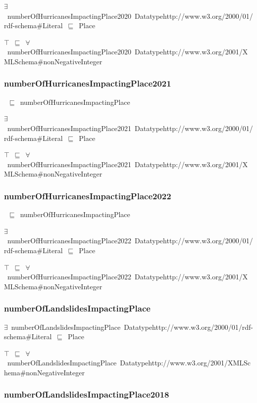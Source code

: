 \documentclass{article}
\begin{document}
\ensuremath{\exists}~numberOfHurricanesImpactingPlace2020~Datatypehttp://www.w3.org/2000/01/rdf-schema#Literal~\ensuremath{\sqsubseteq}~Place

\ensuremath{\top}~\ensuremath{\sqsubseteq}~\ensuremath{\forall}~numberOfHurricanesImpactingPlace2020~Datatypehttp://www.w3.org/2001/XMLSchema#nonNegativeInteger

\subsubsection*{numberOfHurricanesImpactingPlace2021}

~\ensuremath{\sqsubseteq}~numberOfHurricanesImpactingPlace

\ensuremath{\exists}~numberOfHurricanesImpactingPlace2021~Datatypehttp://www.w3.org/2000/01/rdf-schema#Literal~\ensuremath{\sqsubseteq}~Place

\ensuremath{\top}~\ensuremath{\sqsubseteq}~\ensuremath{\forall}~numberOfHurricanesImpactingPlace2021~Datatypehttp://www.w3.org/2001/XMLSchema#nonNegativeInteger

\subsubsection*{numberOfHurricanesImpactingPlace2022}

~\ensuremath{\sqsubseteq}~numberOfHurricanesImpactingPlace

\ensuremath{\exists}~numberOfHurricanesImpactingPlace2022~Datatypehttp://www.w3.org/2000/01/rdf-schema#Literal~\ensuremath{\sqsubseteq}~Place

\ensuremath{\top}~\ensuremath{\sqsubseteq}~\ensuremath{\forall}~numberOfHurricanesImpactingPlace2022~Datatypehttp://www.w3.org/2001/XMLSchema#nonNegativeInteger

\subsubsection*{numberOfLandslidesImpactingPlace}

\ensuremath{\exists}~numberOfLandslidesImpactingPlace~Datatypehttp://www.w3.org/2000/01/rdf-schema#Literal~\ensuremath{\sqsubseteq}~Place

\ensuremath{\top}~\ensuremath{\sqsubseteq}~\ensuremath{\forall}~numberOfLandslidesImpactingPlace~Datatypehttp://www.w3.org/2001/XMLSchema#nonNegativeInteger

\subsubsection*{numberOfLandslidesImpactingPlace2018}
\end{document}
